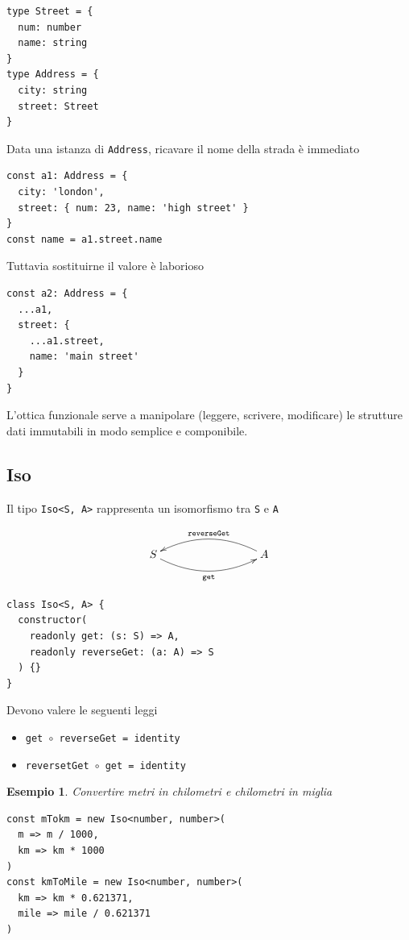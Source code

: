 \documentclass[12pt]{article}
\newtheorem{example}{Esempio}
\begin{document}
\begin{verbatim}
type Street = {
  num: number
  name: string
}
type Address = {
  city: string
  street: Street
}
\end{verbatim}

Data una istanza di \texttt{Address}, ricavare il nome della strada è immediato

\begin{verbatim}
const a1: Address = {
  city: 'london',
  street: { num: 23, name: 'high street' }
}
const name = a1.street.name
\end{verbatim}

Tuttavia sostituirne il valore è laborioso

\begin{verbatim}
const a2: Address = {
  ...a1,
  street: {
    ...a1.street,
    name: 'main street'
  }
}
\end{verbatim}

L'ottica funzionale serve a manipolare (leggere, scrivere, modificare) le strutture dati immutabili in modo semplice e componibile.

\subsection{Iso}

Il tipo \texttt{Iso<S, A>} rappresenta un isomorfismo tra \texttt{S} e \texttt{A}

\[
\xymatrixrowsep{3cm}
\xymatrixcolsep{3cm}
\xymatrix{
  S \ar@/_0.5cm/[r]_{\texttt{get}} & A \ar@/_0.5cm/[l]_{\texttt{reverseGet}}
}
\]

\begin{verbatim}
class Iso<S, A> {
  constructor(
    readonly get: (s: S) => A,
    readonly reverseGet: (a: A) => S
  ) {}
}
\end{verbatim}

Devono valere le seguenti leggi

\begin{itemize}
  \item \texttt{get $\circ$ reverseGet = identity}
  \item \texttt{reversetGet $\circ$ get = identity}
\end{itemize}

\begin{example}

Convertire metri in chilometri e chilometri in miglia

\begin{verbatim}
const mTokm = new Iso<number, number>(
  m => m / 1000,
  km => km * 1000
)
const kmToMile = new Iso<number, number>(
  km => km * 0.621371,
  mile => mile / 0.621371
)
\end{verbatim}
\end{example}
\end{document}
